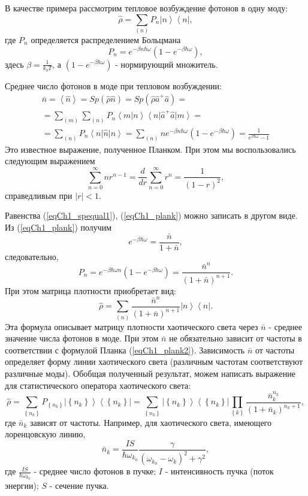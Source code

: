 В качестве примера рассмотрим тепловое возбуждение фотонов в одну
моду:
\begin{equation}
\hat{\rho} = \sum_{(n)}
P_n\left|n\right>\left<n\right|,
\label{eqCh1_teplovvozb}
\end{equation}
где $P_n$ определяется распределением Больцмана
\[
P_n = e^{-\beta n \hbar \omega}\left(1  -  e^{-\beta \hbar \omega}\right),
\]
здесь  $\beta = \frac{1}{k_b T}$, а $\left(1  -  e^{-\beta \hbar
  \omega}\right)$ - нормирующий множитель. 

Среднее число фотонов в моде при тепловом возбуждении:
\begin{eqnarray}
\bar{n} = \left<\hat{n}\right> =  Sp \left(\hat{\rho}\hat{n}\right) = 
Sp \left(\hat{\rho}\hat{a}^{+}\hat{a}\right) = 
\nonumber \\
=\sum_{(m)}\sum_{(n)}
P_n\left<m\right|\left.n\right>\left<n\right|\hat{a}^{+}\hat{a}\left|m\right>
= 
\nonumber \\
= \sum_{(n)}
P_n\left<n\right|\hat{n}\left|n\right> = \sum_{(n)} n
e^{-\beta n \hbar \omega}\left(1  -  e^{-\beta \hbar \omega}\right) = 
\frac{1}{e^{\beta \hbar \omega} - 1}
\label{eqCh1_plank}
\end{eqnarray}
Это известное выражение, полученное Планком. При этом мы
воспользовались следующим выражением
\[
\sum_{n=0}^{\infty} n r^{n -1} = \frac{d}{d r} \sum_{n=0}^{\infty}
r^{n} = \frac{1}{\left(1 - r\right)^2},
\]
справедливым при $\left|r\right| < 1$.

Равенства (\ref{eqCh1_spequal1}), (\ref{eqCh1_plank}) можно записать в
другом виде. Из (\ref{eqCh1_plank}) получим 
\[
e^{-\beta \hbar \omega} = \frac{\bar{n}}{1 + \bar{n}},
\]
следовательно, 
\begin{equation}
P_n = e^{-\beta \hbar \omega n} \left(1  -  e^{-\beta \hbar
  \omega}\right) = \frac{\bar{n}^n}{\left(1 + \bar{n}\right)^{n+1}}.
\label{eqCh1_plank2}
\end{equation}
При этом матрица плотности приобретает вид:
\[
\hat{\rho} = \sum_{(n)}\frac{\bar{n}^n}{\left(1 + \bar{n}\right)^{n+1}}\left|n\right>\left<n\right|.
\]
Эта формула описывает матрицу плотности хаотического света через
$\bar{n}$ -  среднее значение числа фотонов в моде. При этом
$\bar{n}$ не обязательно зависит от частоты в соответствии с формулой
Планка (\ref{eqCh1_plank2}). Зависимость $\bar{n}$ от частоты
определяет форму линии хаотического света (различным частотам
соответствуют различные моды). Обобщая полученный результат, можем
написать выражение для статистического оператора хаотического света:  
\begin{equation}
\hat{\rho} = \sum_{\left\{n_k\right\}} P_{\left\{n_k\right\}} \left|\left\{n_k\right\}\right>\left<\left\{n_k\right\}\right| = 
\sum_{\left\{n_k\right\}} 
 \left|\left\{n_k\right\}\right>\left<\left\{n_k\right\}\right|
\prod_{\left\{k\right\}} 
\frac{\bar{n}_k^{n_k}}{\left(1 + \bar{n}_k\right)^{n_k+1}},
\label{eqCh1_102}
\end{equation}
где $\bar{n}_k$  зависят от частоты. Например, для хаотического света,
имеющего лоренцовскую линию, 
\[
\bar{n}_k = \frac{I S}{\hbar \omega_{k_0}}
\frac{\gamma}{\left(\omega_{k_0} - \omega_{k}\right)^2 + \gamma^2},
\]
где $\frac{I S}{\hbar \omega_{k_0}}$   -  среднее число фотонов в
пучке;  $I$ -  интенсивность пучка (поток энергии);  $S$ -  сечение
пучка.  
